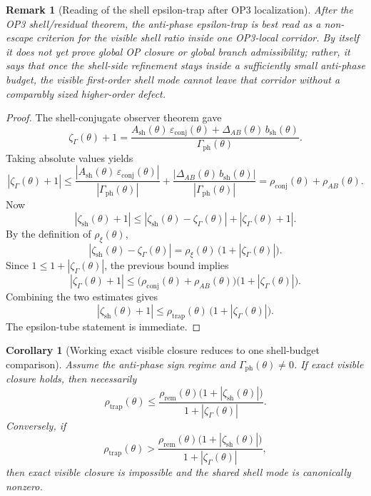\documentclass[12pt,a4paper]{article}
\newtheorem{corollary}[theorem]{Corollary}
\newtheorem{remark}[theorem]{Remark}
\begin{document}
\begin{remark}[Reading of the shell epsilon-trap after OP3 localization]
After the OP3 shell/residual theorem, the anti-phase epsilon-trap is best read as a non-escape criterion for the visible shell ratio inside one OP3-local corridor. By itself it does not yet prove global OP closure or global branch admissibility; rather, it says that once the shell-side refinement stays inside a sufficiently small anti-phase budget, the visible first-order shell mode cannot leave that corridor without a comparably sized higher-order defect.
\end{remark}

\begin{proof}
The shell-conjugate observer theorem gave
\[
 \zeta_{\Gamma}(\theta)+1
 =
 \frac{A_{\mathrm{sh}}(\theta)\,\varepsilon_{\mathrm{conj}}(\theta)
 +\Delta_{AB}(\theta)\,b_{\mathrm{sh}}(\theta)}{\Gamma_{\mathrm{ph}}(\theta)}.
\]
Taking absolute values yields
\[
 |\zeta_{\Gamma}(\theta)+1|
 \le
 \frac{|A_{\mathrm{sh}}(\theta)\,\varepsilon_{\mathrm{conj}}(\theta)|}{|\Gamma_{\mathrm{ph}}(\theta)|}
 +
 \frac{|\Delta_{AB}(\theta)\,b_{\mathrm{sh}}(\theta)|}{|\Gamma_{\mathrm{ph}}(\theta)|}
 =
 \rho_{\mathrm{conj}}(\theta)+\rho_{AB}(\theta).
\]
Now
\[
 |\zeta_{\mathrm{sh}}(\theta)+1|
 \le
 |\zeta_{\mathrm{sh}}(\theta)-\zeta_{\Gamma}(\theta)|
 +
 |\zeta_{\Gamma}(\theta)+1|.
\]
By the definition of $\rho_{\xi}(\theta)$,
\[
 |\zeta_{\mathrm{sh}}(\theta)-\zeta_{\Gamma}(\theta)|
 =
 \rho_{\xi}(\theta)\,\bigl(1+|\zeta_{\Gamma}(\theta)|\bigr).
\]
Since $1\le 1+|\zeta_{\Gamma}(\theta)|$, the previous bound implies
\[
 |\zeta_{\Gamma}(\theta)+1|
 \le
 \bigl(\rho_{\mathrm{conj}}(\theta)+\rho_{AB}(\theta)\bigr)
 \bigl(1+|\zeta_{\Gamma}(\theta)|\bigr).
\]
Combining the two estimates gives
\[
 |\zeta_{\mathrm{sh}}(\theta)+1|
 \le
 \rho_{\mathrm{trap}}(\theta)\,\bigl(1+|\zeta_{\Gamma}(\theta)|\bigr).
\]
The epsilon-tube statement is immediate.
\end{proof}

\begin{corollary}[Working exact visible closure reduces to one shell-budget comparison]
Assume the anti-phase sign regime and $\Gamma_{\mathrm{ph}}(\theta)\neq 0$. If exact visible closure holds, then necessarily
\[
 \rho_{\mathrm{trap}}(\theta)
 \le
 \frac{\rho_{\mathrm{rem}}(\theta)
 \bigl(1+|\zeta_{\mathrm{sh}}(\theta)|\bigr)}{1+|\zeta_{\Gamma}(\theta)|}.
\]
Conversely, if
\[
 \rho_{\mathrm{trap}}(\theta)
 >
 \frac{\rho_{\mathrm{rem}}(\theta)
 \bigl(1+|\zeta_{\mathrm{sh}}(\theta)|\bigr)}{1+|\zeta_{\Gamma}(\theta)|},
\]
then exact visible closure is impossible and the shared shell mode is canonically nonzero.
\end{corollary}
\end{document}

